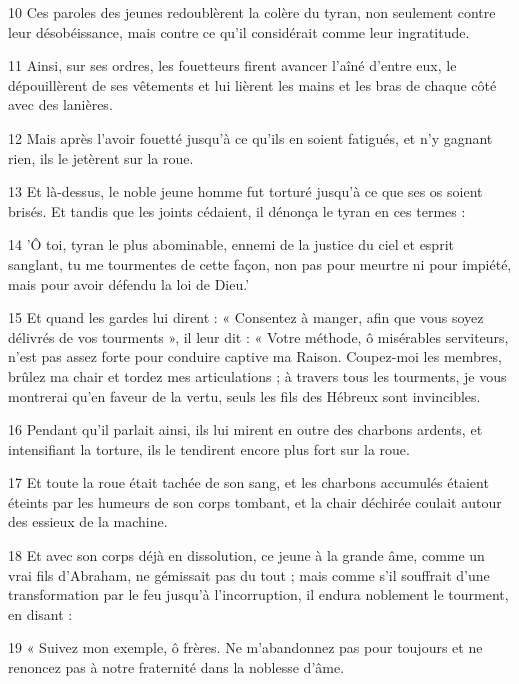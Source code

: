 \par 10 Ces paroles des jeunes redoublèrent la colère du tyran, non seulement contre leur désobéissance, mais contre ce qu'il considérait comme leur ingratitude.

\par 11 Ainsi, sur ses ordres, les fouetteurs firent avancer l'aîné d'entre eux, le dépouillèrent de ses vêtements et lui lièrent les mains et les bras de chaque côté avec des lanières.

\par 12 Mais après l'avoir fouetté jusqu'à ce qu'ils en soient fatigués, et n'y gagnant rien, ils le jetèrent sur la roue.

\par 13 Et là-dessus, le noble jeune homme fut torturé jusqu'à ce que ses os soient brisés. Et tandis que les joints cédaient, il dénonça le tyran en ces termes :

\par 14 'Ô toi, tyran le plus abominable, ennemi de la justice du ciel et esprit sanglant, tu me tourmentes de cette façon, non pas pour meurtre ni pour impiété, mais pour avoir défendu la loi de Dieu.'

\par 15 Et quand les gardes lui dirent : « Consentez à manger, afin que vous soyez délivrés de vos tourments », il leur dit : « Votre méthode, ô misérables serviteurs, n'est pas assez forte pour conduire captive ma Raison. Coupez-moi les membres, brûlez ma chair et tordez mes articulations ; à travers tous les tourments, je vous montrerai qu'en faveur de la vertu, seuls les fils des Hébreux sont invincibles.

\par 16 Pendant qu'il parlait ainsi, ils lui mirent en outre des charbons ardents, et intensifiant la torture, ils le tendirent encore plus fort sur la roue.

\par 17 Et toute la roue était tachée de son sang, et les charbons accumulés étaient éteints par les humeurs de son corps tombant, et la chair déchirée coulait autour des essieux de la machine.

\par 18 Et avec son corps déjà en dissolution, ce jeune à la grande âme, comme un vrai fils d'Abraham, ne gémissait pas du tout ; mais comme s'il souffrait d'une transformation par le feu jusqu'à l'incorruption, il endura noblement le tourment, en disant :

\par 19 « Suivez mon exemple, ô frères. Ne m'abandonnez pas pour toujours et ne renoncez pas à notre fraternité dans la noblesse d'âme.

